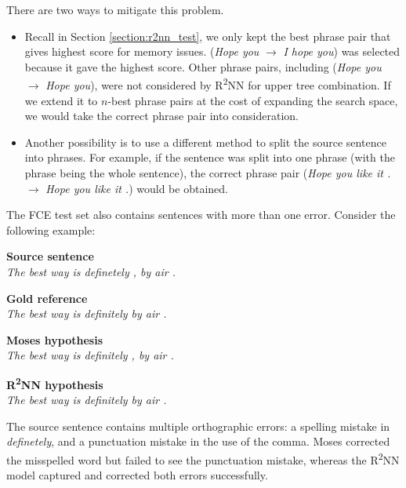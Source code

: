 \documentclass[12pt,a4paper,twoside]{report}
\begin{document}
There are two ways to mitigate this problem.
\begin{itemize}
    \item Recall in Section \ref{section:r2nn_test}, we only kept the best phrase pair that gives highest score for memory issues. (\textit{Hope you} $\rightarrow$ \textit{I hope you}) was selected because it gave the highest score. Other phrase pairs, including (\textit{Hope you} $\rightarrow$ \textit{Hope you}), were not considered by R\textsuperscript{2}NN for upper tree combination. If we extend it to $n$-best phrase pairs at the cost of expanding the search space, we would take the correct phrase pair into consideration.
    \item Another possibility is to use a different method to split the source sentence into phrases. For example, if the sentence was split into one phrase (with the phrase being the whole sentence), the correct phrase pair (\textit{Hope you like it .} $\rightarrow$ \textit{Hope you like it .}) would be obtained.
\end{itemize}

The FCE test set also contains sentences with more than one error. Consider the following example:

\hfill\begin{minipage}{\dimexpr\textwidth-0.8cm}
    \vspace*{1mm}
    \textbf{Source sentence}\\
    \textit{The best way is definetely , by air .}

    \vspace*{1mm}

    \textbf{Gold reference}\\
    \textit{The best way is definitely by air .}

    \vspace*{1mm}

    \textbf{Moses hypothesis}\\
    \textit{The best way is definitely , by air . }

    \vspace*{1mm}

    \textbf{R\textsuperscript{2}NN hypothesis}\\
    \textit{The best way is definitely by air .}
    \vspace*{1mm}
\end{minipage}

The source sentence contains multiple orthographic errors: a spelling mistake in \textit{definetely}, and a punctuation mistake in the use of the comma. Moses corrected the misspelled word but failed to see the punctuation mistake, whereas the R\textsuperscript{2}NN model captured and corrected both errors successfully.
\end{document}
